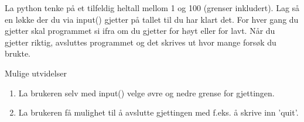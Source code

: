 %
%
La python tenke på et tilfeldig heltall mellom 1 og 100 (grenser inkludert).
Lag så en løkke der du via input() gjetter på tallet til du har klart det.
For hver gang du gjetter skal programmet si ifra om du gjetter for høyt eller for lavt.
Når du gjetter riktig, avsluttes programmet og det skrives ut hvor mange forsøk du brukte.

Mulige utvidelser
\begin{enumerate}
\item La brukeren selv med input() velge øvre og nedre grense for gjettingen.
\item La brukeren få mulighet til å avslutte gjettingen med f.eks. å skrive inn 'quit'.
\end{enumerate}
